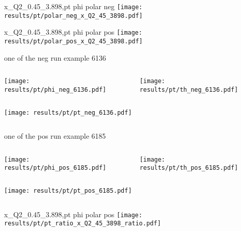 \begin{frame}{x\_Q2\_0.45\_3.898,pt phi polar neg}
\texttt{[image: results/pt/polar\_neg\_x\_Q2\_45\_3898.pdf]}
\end{frame}
\begin{frame}{x\_Q2\_0.45\_3.898,pt phi polar pos}
\texttt{[image: results/pt/polar\_pos\_x\_Q2\_45\_3898.pdf]}
\end{frame}
\begin{frame}{one of the neg run example 6136}
\begin{columns}
\begin{column}[T]{0.5\textwidth}
\texttt{[image: results/pt/phi\_neg\_6136.pdf]}
\end{column}
\begin{column}[T]{0.5\textwidth}
\texttt{[image: results/pt/th\_neg\_6136.pdf]}
\end{column}
\end{columns}
\begin{columns}
\begin{column}[T]{0.5\textwidth}
\texttt{[image: results/pt/pt\_neg\_6136.pdf]}
\end{column}
\begin{column}[T]{0.5\textwidth}
\end{column}
\end{columns}
\end{frame}
\begin{frame}{one of the pos run example 6185}
\begin{columns}
\begin{column}[T]{0.5\textwidth}
\texttt{[image: results/pt/phi\_pos\_6185.pdf]}
\end{column}
\begin{column}[T]{0.5\textwidth}
\texttt{[image: results/pt/th\_pos\_6185.pdf]}
\end{column}
\end{columns}
\begin{columns}
\begin{column}[T]{0.5\textwidth}
\texttt{[image: results/pt/pt\_pos\_6185.pdf]}
\end{column}
\begin{column}[T]{0.5\textwidth}
\end{column}
\end{columns}
\end{frame}
\begin{frame}{x\_Q2\_0.45\_3.898,pt phi polar pos}
\texttt{[image: results/pt/pt\_ratio\_x\_Q2\_45\_3898\_ratio.pdf]}
\end{frame}
